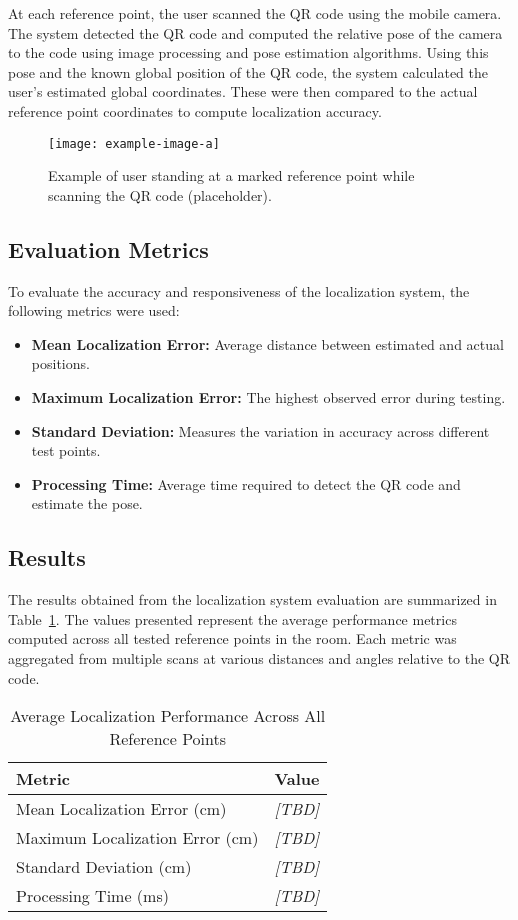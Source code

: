 At each reference point, the user scanned the QR code using the mobile camera. The system detected the QR code and computed the relative pose of the camera to the code using image processing and pose estimation algorithms. Using this pose and the known global position of the QR code, the system calculated the user’s estimated global coordinates. These were then compared to the actual reference point coordinates to compute localization accuracy.

\begin{figure}[h]
	\centering
	\texttt{[image: example-image-a]}
	\caption{Example of user standing at a marked reference point while scanning the QR code (placeholder).}
	\label{fig:procedure_scan}
\end{figure}

\subsection{Evaluation Metrics}

To evaluate the accuracy and responsiveness of the localization system, the following metrics were used:

\begin{itemize}
	\item \textbf{Mean Localization Error:} Average distance between estimated and actual positions.
	\item \textbf{Maximum Localization Error:} The highest observed error during testing.
	\item \textbf{Standard Deviation:} Measures the variation in accuracy across different test points.
	\item \textbf{Processing Time:} Average time required to detect the QR code and estimate the pose.
\end{itemize}
\subsection{Results}

The results obtained from the localization system evaluation are summarized in Table~\ref{tab:localization_metrics}. The values presented represent the average performance metrics computed across all tested reference points in the room. Each metric was aggregated from multiple scans at various distances and angles relative to the QR code.

\begin{table}[h]
	\centering
	\caption{Average Localization Performance Across All Reference Points}
	\label{tab:localization_metrics}
	\begin{tabular}{|l|c|}
		\hline
		\textbf{Metric} & \textbf{Value} \\
		\hline
		Mean Localization Error (cm) & \textit{[TBD]} \\
		Maximum Localization Error (cm) & \textit{[TBD]} \\
		Standard Deviation (cm) & \textit{[TBD]} \\
		Processing Time (ms) & \textit{[TBD]} \\
		\hline
	\end{tabular}
\end{table}


